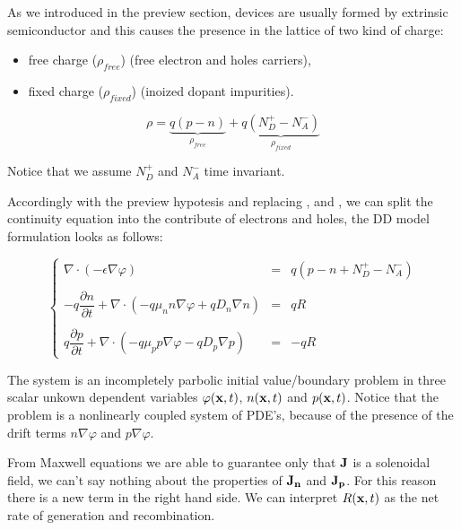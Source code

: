 As we introduced in the preview section, devices are usually formed by extrinsic semiconductor and this causes the presence in the lattice of two kind of charge:
\begin{itemize}
\item free charge ($\rho_{free}$) (free electron and holes carriers),
\item fixed charge ($\rho_{fixed}$) (inoized dopant impurities).
\end{itemize} 

\begin{equation}
\label{eq: charge balance}
\rho = \underbrace{q(p-n)}_{\rho_{free}} +\underbrace{q(N_D^+-N_A^-)}_{\rho_{fixed}}
\end{equation}

 Notice that we assume $N_D^+$ and $N_A^-$ time invariant.

 Accordingly with the preview hypotesis and replacing ,  and , we can split the continuity equation into the contribute of electrons and holes, the DD model formulation looks as follows:
 
\begin{equation}
\label{eq: full problem}
\left\{
\begin{array}{rcl}
\nabla \cdot (-\epsilon \nabla \varphi) & = & q(p-n+N_D^+-N_A^-)\\ \\
-q\dfrac{\partial n}{\partial t} + \nabla \cdot ( - q\mu_n n \nabla \varphi + qD_n \nabla n )& = & qR\\ \\
q\dfrac{\partial p}{\partial t} + \nabla \cdot (- q\mu_p p \nabla \varphi - qD_p \nabla p )& = & -qR 
\end{array}
\right.
\end{equation}

The system is an incompletely parbolic initial value/boundary problem in three scalar unkown dependent variables $\varphi(\mathbf{x},t)$, $n(\mathbf{x},t)$ and $p(\mathbf{x},t)$. Notice that the problem is a nonlinearly coupled system of PDE's, because of the presence of the drift terms $n\nabla \varphi$ and $p \nabla 	\varphi$. 

From Maxwell equations we are able to guarantee only that $\mathbf{J}$ is a solenoidal field, we can't say nothing about the properties of $\mathbf{J_n}$ and $\mathbf{J_p}$. For this reason there is a new term in the right hand side. We can interpret $R(\mathbf{x},t)$ as the net rate of generation and recombination.

